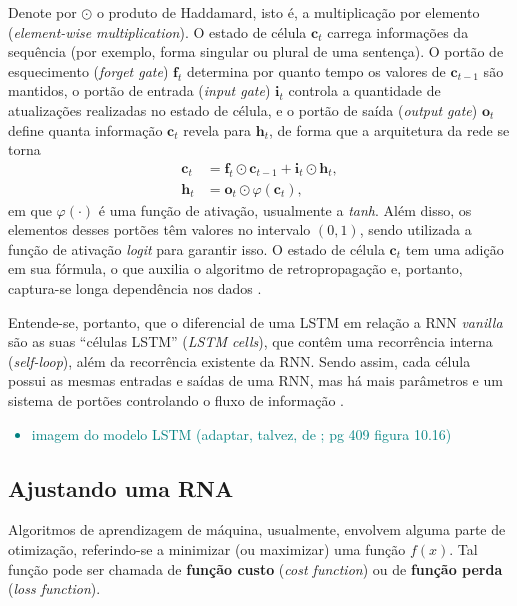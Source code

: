 \documentclass{automatextcc}
\newcommand{\nico}[1]{\textcolor{teal}{#1}}
\newcommand{\bs}[1]{\boldsymbol{#1}}
\begin{document}
Denote por $\odot$ o produto de Haddamard, isto é, a multiplicação por elemento (\textit{element-wise multiplication}). O estado de célula $\bs{c}_t$ carrega informações da sequência (por exemplo, forma singular ou plural de uma sentença). O portão de esquecimento (\textit{forget gate}) $\bs{f}_t$ determina por quanto tempo os valores de $\bs{c}_{t-1}$ são mantidos, o portão de entrada (\textit{input gate}) $\bs{i}_t$ controla a quantidade de atualizações realizadas no estado de célula, e o portão de saída (\textit{output gate}) $\bs{o}_t$ define quanta informação $\bs{c}_t$ revela para $\bs{h}_t$, de forma que a arquitetura da rede se torna 
\begin{align*}
    \bs{c}_{t} & = \bs{f}_{t} \odot \bs{c}_{t-1} + \bs{i}_{t} \odot \bs{h}_{t}, \\
    \bs{h}_{t} & = \bs{o}_{t} \odot \varphi(\bs{c}_{t}),
\end{align*}
em que $\varphi(\cdot)$ é uma função de ativação, usualmente a \textit{tanh}. Além disso, os elementos desses portões têm valores no intervalo $(0,1)$, sendo utilizada a função de ativação \textit{logit} para garantir isso. O estado de célula $\bs{c}_t$ tem uma adição em sua fórmula, o que auxilia o algoritmo de retropropagação e, portanto, captura-se longa dependência nos dados \citep{goodfellow2016, fan2021}.

Entende-se, portanto, que o diferencial de uma LSTM em relação a RNN \textit{vanilla} são as suas ``células LSTM'' (\textit{LSTM cells}), que contêm uma recorrência interna (\textit{self-loop}), além da recorrência existente da RNN. Sendo assim, cada célula possui as mesmas entradas e saídas de uma RNN, mas há mais parâmetros e um sistema de portões controlando o fluxo de informação \citep{goodfellow2016}.

\nico{
\begin{itemize}
    \item imagem do modelo LSTM (adaptar, talvez, de \citet{goodfellow2016}; pg 409 figura 10.16)
\end{itemize}
}



\subsection{Ajustando uma RNA}
Algoritmos de aprendizagem de máquina, usualmente, envolvem alguma parte de otimização, referindo-se a minimizar (ou maximizar) uma função $f(x)$. Tal função pode ser chamada de \textbf{função custo} (\textit{cost function}) ou de \textbf{função perda} (\textit{loss function}). 
\end{document}
